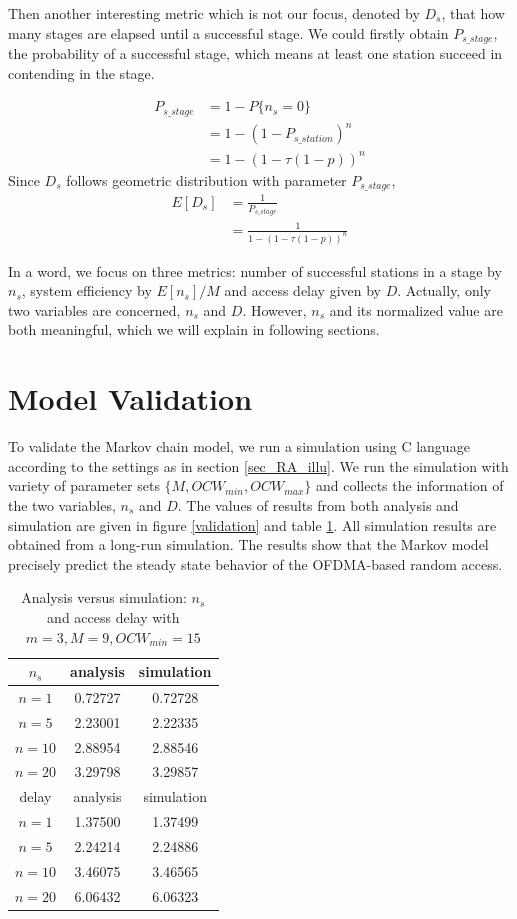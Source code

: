 Then another interesting metric which is not our focus, denoted by $D_s$, that how many stages are elapsed until a successful stage. 
We could firstly obtain $P_{s\_stage}$, the probability of a successful stage, which means at least one station succeed in contending in the stage.

\begin{align}
P_{s\_stage} &= 1-P\lbrace n_s = 0\rbrace \nonumber \\
	&= 1-(1-P_{s\_station})^n \nonumber\\
	&= 1-(1-\tau(1-p))^n
\end{align} 	 
Since $D_s$ follows geometric distribution with parameter $P_{s\_stage}$,  
\begin{align}
E[D_s] &= \frac{1}{P_{s\_stage}}  \nonumber \\
			&= \frac{1}{1-(1-\tau(1-p))^n}
\end{align} 

In a word, we focus on three metrics: number of successful stations in a stage by $n_s$, system efficiency by $E[n_s]/M$ and access delay given by $D$. 
Actually, only two variables are concerned, $n_s$ and $D$. However, $n_s$ and its normalized value are both meaningful, which we will explain in following sections.


\section{Model Validation} 		\label{sec_model_val}
To validate the Markov chain model, we run a simulation using C language according to the settings as in section \ref{sec_RA_illu}. 
We run the simulation with variety of parameter sets $\lbrace M, OCW_{min}, OCW_{max}\rbrace$ and collects the information of the two variables, $n_s$ and $D$. 
The values of results from both analysis and simulation are given in figure \ref{validation} and table \ref{table_val}. 
All simulation results are obtained from a long-run simulation.
The results show that the Markov model precisely predict the steady state behavior of the OFDMA-based random access.
\begin{table}[!h]
\caption{Analysis versus simulation: $n_s$ and access delay with $m=3,M=9,OCW_{min} = 15$}
\label{table_val}
\begin{center}
\begin{tabular}{c|c|c}
\hline
$n_s$ 	& analysis 	& simulation \\
\hline
$n=1$ 	& 0.72727  	& 0.72728 \\
$n=5$ 	& 2.23001	& 2.22335 \\
$n=10$	& 2.88954	& 2.88546 \\
$n=20$	& 3.29798	& 3.29857 \\
\hline
delay	& analysis	& simulation \\
\hline
$n=1$ 	& 1.37500  	& 1.37499 \\
$n=5$ 	& 2.24214	& 2.24886 \\
$n=10$	& 3.46075	& 3.46565 \\
$n=20$	& 6.06432	& 6.06323 \\
\hline
\end{tabular}
\end{center}
\end{table}

